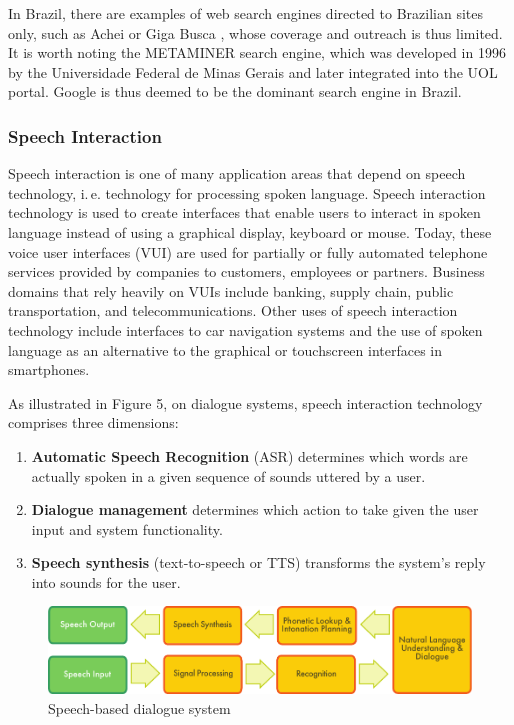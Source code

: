 \begin{multicols}{2}
In Brazil, there are examples of web search engines directed to Brazilian sites only, such as Achei \cite{achei} or Giga Busca \cite{busca}, 
whose coverage and outreach is thus limited. It is worth noting the METAMINER search engine, 
which was developed in 1996 by the Universidade Federal de Minas Gerais and later integrated into the UOL portal.
Google is thus deemed to be the dominant search engine in Brazil. 

\subsubsection{Speech Interaction}

Speech interaction is one of many application areas that depend on speech technology, i.\,e. technology for processing spoken language. 
Speech interaction technology is used to create interfaces that enable users to interact in spoken language instead of using a graphical display, keyboard or mouse.  Today, these voice user interfaces (VUI) are used for partially or fully automated telephone services provided by companies to customers, employees or partners. Business domains that rely heavily on VUIs include banking, supply chain, public transportation, and telecommunications. Other uses of speech interaction technology include interfaces to car navigation systems and the use of spoken language as an alternative to the graphical or touchscreen interfaces in smartphones.


As illustrated in Figure 5, on dialogue systems, speech interaction technology comprises three dimensions: 

\begin{enumerate}
\item \textbf{Automatic Speech Recognition} (ASR) determines which words are actually spoken in a given sequence of sounds uttered by a user.  
\item \textbf{Dialogue management} determines which action to take given the user input and system functionality.   
\item \textbf{Speech synthesis} (text-to-speech or TTS) transforms the system’s reply into sounds for the user.
\end{enumerate}

\begin{figure}[htb]
  \center
  \includegraphics[width=\textwidth]{../_media/english/simple_speech-based_dialogue_architecture}
  \caption{Speech-based dialogue system}
  \label{fig:dialoguearch_en}
\end{figure}


\end{multicols}
